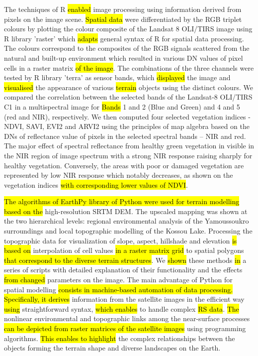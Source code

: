 \documentclass[jimaging,article,submit,pdftex,moreauthors]{Definitions/mdpi}
\begin{document}
The techniques of R \hl{enabled} image processing\hl{ }using information derived from pixels on the image scene. \hl{Spatial data} were differentiated by the RGB triplet colours by plotting the colour composite of the Landsat 8 OLI/TIRS image using R library 'raster' which \hl{adapts} general syntax of R for spatial data processing. The colours correspond to the composites of the RGB signals scattered from the natural and built-up environment which resulted in various DN values of pixel cells in a raster matrix \hl{of the image}. The combinations of the three channels were tested by R library 'terra' as sensor bands, which \hl{displayed} the image and \hl{visualised} the appearance of various \hl{terrain }objects\hl{ }using the distinct colours. We compared the correlation between the selected bands of the Landsat-8 OLI/TIRS C1 in a multispectral image for \hl{Bands} 1 and 2 (Blue and Green) and 4 and 5 (red and NIR), respectively. We then computed four selected vegetation indices - NDVI, SAVI, EVI2 and ARVI2 using the principles of map algebra based on the DNs of reflectance value of pixels in the selected spectral bands -- NIR and red. The major effect of spectral reflectance from healthy green vegetation in visible in the NIR region of image spectrum with a strong NIR response raising sharply for healthy vegetation. Conversely, the areas with poor or damaged vegetation are represented by low NIR response which notably decreases, as shown on the vegetation indices \hl{with corresponding lower values of NDVI}. 

\hl{The algorithms of EarthPy library of Python were used for terrain modelling based on the} high-resolution SRTM DEM. The upscaled mapping was shown at the two hierarchical levels: regional environmental analysis of the Yamoussoukro surroundings and local topographic modelling of the Kossou Lake. Processing the topographic data for\hl{ }visualization of slope, aspect, hillshade and elevation \hl{is based on} interpolation of cell values \hl{in a raster matrix grid} to spatial polygons\hl{ that correspond to the diverse terrain structures}. We \hl{shown} these methods \hl{in} a series of scripts with detailed explanation of their functionality and the effects\hl{ from changed} parameters on the image. The main advantage of\hl{ }Python for spatial modelling \hl{consists in machine-based automation of data processing. Specifically, it derives} information from the satellite images in the efficient way \hl{using} straightforward syntax, \hl{which enables} to handle complex \hl{RS data}. \hl{The }nonlinear environmental and topographic links among the near-surface processes \hl{can be depicted from raster matrices of the satellite images} using programming algorithms. \hl{This enables to highlight }the complex relationships between the objects forming the terrain shape and diverse landscapes on the Earth. 
\end{document}
